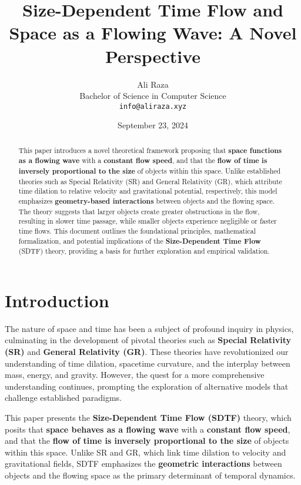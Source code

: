\documentclass[12pt]{article}
\title{Size-Dependent Time Flow and Space as a Flowing Wave: A Novel Perspective}
\author{Ali Raza\\
Bachelor of Science in Computer Science\\
\texttt{info@aliraza.xyz}}
\date{September 23, 2024}
\begin{document}
\maketitle

\begin{abstract}
This paper introduces a novel theoretical framework proposing that \textbf{space functions as a flowing wave} with a \textbf{constant flow speed}, and that the \textbf{flow of time is inversely proportional to the size} of objects within this space. Unlike established theories such as Special Relativity (SR) and General Relativity (GR), which attribute time dilation to relative velocity and gravitational potential, respectively, this model emphasizes \textbf{geometry-based interactions} between objects and the flowing space. The theory suggests that larger objects create greater obstructions in the flow, resulting in slower time passage, while smaller objects experience negligible or faster time flows. This document outlines the foundational principles, mathematical formalization, and potential implications of the \textbf{Size-Dependent Time Flow} (SDTF) theory, providing a basis for further exploration and empirical validation.
\end{abstract}

\newpage

\tableofcontents

\newpage

\section{Introduction}

The nature of space and time has been a subject of profound inquiry in physics, culminating in the development of pivotal theories such as \textbf{Special Relativity (SR)} and \textbf{General Relativity (GR)}. These theories have revolutionized our understanding of time dilation, spacetime curvature, and the interplay between mass, energy, and gravity. However, the quest for a more comprehensive understanding continues, prompting the exploration of alternative models that challenge established paradigms.

This paper presents the \textbf{Size-Dependent Time Flow (SDTF)} theory, which posits that \textbf{space behaves as a flowing wave} with a \textbf{constant flow speed}, and that the \textbf{flow of time is inversely proportional to the size} of objects within this space. Unlike SR and GR, which link time dilation to velocity and gravitational fields, SDTF emphasizes the \textbf{geometric interactions} between objects and the flowing space as the primary determinant of temporal dynamics.
\end{document}
